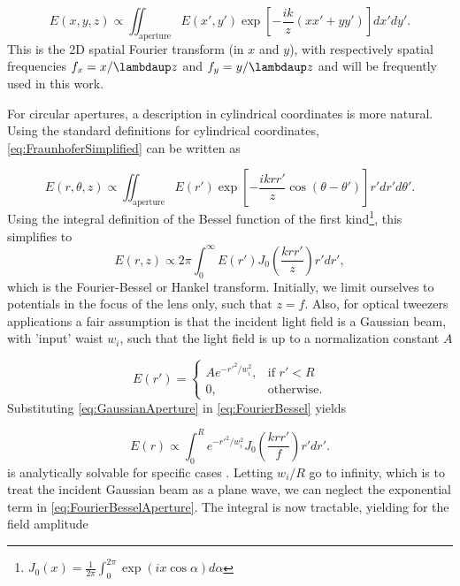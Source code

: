\begin{mdframed}
    \begin{equation}\label{eq:FraunhoferSimplified}
        E(x,y,z) \propto 
        \iint_{\text{aperture}} E(x',y') \exp{\left[- \frac{ik}{z}(xx'+yy')\right]}dx'dy'.
    \end{equation}
    This is the 2D spatial Fourier transform (in $x$ and $y$), with respectively spatial frequencies $f_x = x/\lambdaup z$ and $f_y = y/\lambdaup z$ and will be frequently used in this work.
\end{mdframed}

\noindent For circular apertures, a description in cylindrical coordinates is more natural. 
Using the standard definitions for cylindrical coordinates, \cref{eq:FraunhoferSimplified} can be written as

\begin{equation}\label{eq:FraunhoferRTheta}
    E(r,\theta, z) \propto \iint_{\text{aperture}} E(r') \exp{\left[
    -\frac{i k r r'}{z} \cos{(\theta-\theta')} 
    \right]}r'dr'd\theta'.
\end{equation}
Using the integral definition of the Bessel function of the first kind\footnote{$J_0(x) = \frac{1}{2\pi} \int_0^{2\pi} \exp{(i x \cos{\alpha})} d\alpha$}, this simplifies to
\begin{equation}\label{eq:FourierBessel}
    E(r,z) \propto 2\pi \int_0^{\infty} E(r') J_0\left( \frac{k r r'}{z}\right) r'dr',
\end{equation}
which is the Fourier-Bessel or Hankel transform.
Initially, we limit ourselves to potentials in the focus of the lens only, such that $z=f$. Also, for optical tweezers applications a fair assumption is that the incident light field is a Gaussian beam, with 'input' waist $w_i$, such that the light field is up to a normalization constant $A$

\begin{equation}\label{eq:GaussianAperture}
    E(r')=
    \begin{cases}
        A e^{- r'^2/w_i^2},& \text{if } r' < R\\
        0,               & \text{otherwise}.
    \end{cases}
\end{equation}
Substituting \cref{eq:GaussianAperture} in \cref{eq:FourierBessel} yields

\begin{equation}\label{eq:FourierBesselAperture}
    E(r) \propto \int_0^R e^{-r'^2/w_i^2} J_0\left(\frac{k r r'}{f}\right)r'dr'.
\end{equation}
 is analytically solvable for specific cases \cite{Madjarov2020}.
Letting $w_i/R$ go to infinity, which is to treat the incident Gaussian beam as a plane wave, we can neglect the exponential term in \cref{eq:FourierBesselAperture}. 
The integral is now tractable, yielding for the field amplitude

